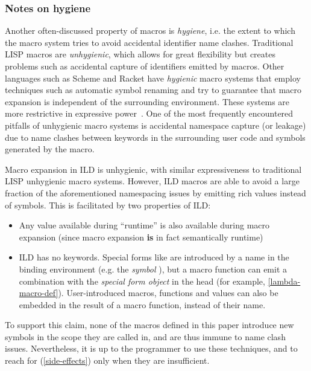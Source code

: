 \subsubsection{Notes on hygiene}
\label{hygiene-discussion}
Another often-discussed property of macros is \emph{hygiene}, i.e. the extent
to which the macro system tries to avoid accidental identifier name clashes.
Traditional LISP macros are \emph{unhygienic}, which allows for great
flexibility but creates problems such as accidental capture of identifiers
emitted by macros. Other languages such as Scheme and Racket have
\emph{hygienic} macro systems that employ techniques such as automatic symbol
renaming and try to guarantee that macro expansion is independent of the
surrounding environment. These systems are more restrictive in expressive
power~\cite{r5rs,racket}. One of the most frequently encountered pitfalls of
unhygienic macro systems is accidental namespace capture (or leakage) due to
name clashes between keywords in the surrounding user code and symbols
generated by the macro.%
~\cite{kohlbecker1986syntactic,clinger-explicit-renaming}

Macro expansion in ILD is unhygienic, with similar expressiveness
to traditional LISP unhygienic macro systems. However, ILD macros
are able to avoid a large fraction of the aforementioned namespacing issues by
emitting rich values instead of symbols. This is facilitated by two
properties of ILD:
\begin{itemize}
\item Any value available during ``runtime'' is also available during macro expansion (since
macro expansion \textbf{is} in fact semantically runtime)
\item ILD has no keywords. Special forms like  are introduced by a name in
the binding environment (e.g. the \emph{symbol} ), but a macro function can emit a combination
with the \emph{special form object}  in the head (for example, \cref{lambda-macro-def}). User-introduced
macros, functions and values can also be embedded in the result of a macro function,
instead of their name.
\end{itemize}
To support this claim, none of the macros defined in this paper introduce new
symbols in the scope they are called in, and are thus immune to name clash issues.
Nevertheless, it is up to the programmer to use these techniques, and to reach
for  (\cref{side-effects}) only when they are insufficient.
